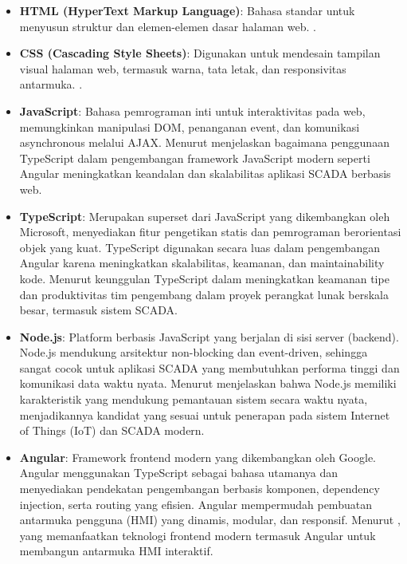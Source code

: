 \begin{itemize}
    \item \textbf{HTML (HyperText Markup Language)}: Bahasa standar untuk menyusun struktur dan elemen-elemen dasar halaman web. \textcite{bhanarkar2023responsive}.

    \item \textbf{CSS (Cascading Style Sheets)}: Digunakan untuk mendesain tampilan visual halaman web, termasuk warna, tata letak, dan responsivitas antarmuka. \textcite{singh2014responsive}.

    \item \textbf{JavaScript}: Bahasa pemrograman inti untuk interaktivitas pada web, memungkinkan manipulasi DOM, penanganan event, dan komunikasi asynchronous melalui AJAX. Menurut \textcite{emmanni2025typescript} menjelaskan bagaimana penggunaan TypeScript dalam pengembangan framework JavaScript modern seperti Angular meningkatkan keandalan dan skalabilitas aplikasi SCADA berbasis web.

    \item \textbf{TypeScript}: Merupakan superset dari JavaScript yang dikembangkan oleh Microsoft, menyediakan fitur pengetikan statis dan pemrograman berorientasi objek yang kuat. TypeScript digunakan secara luas dalam pengembangan Angular karena meningkatkan skalabilitas, keamanan, dan maintainability kode. Menurut \textcite{scarsbrook2023typescript} keunggulan TypeScript dalam meningkatkan keamanan tipe dan produktivitas tim pengembang dalam proyek perangkat lunak berskala besar, termasuk sistem SCADA.

    \item \textbf{Node.js}: Platform berbasis JavaScript yang berjalan di sisi server (backend). Node.js mendukung arsitektur non-blocking dan event-driven, sehingga sangat cocok untuk aplikasi SCADA yang membutuhkan performa tinggi dan komunikasi data waktu nyata. Menurut \textcite{ancona2018nodejs} menjelaskan bahwa Node.js memiliki karakteristik yang mendukung pemantauan sistem secara waktu nyata, menjadikannya kandidat yang sesuai untuk penerapan pada sistem Internet of Things (IoT) dan SCADA modern.

    \item \textbf{Angular}: Framework frontend modern yang dikembangkan oleh Google. Angular menggunakan TypeScript sebagai bahasa utamanya dan menyediakan pendekatan pengembangan berbasis komponen, dependency injection, serta routing yang efisien. Angular mempermudah pembuatan antarmuka pengguna (HMI) yang dinamis, modular, dan responsif. Menurut \textcite{jointjs2023scada}, yang memanfaatkan teknologi frontend modern termasuk Angular untuk membangun antarmuka HMI interaktif.

\end{itemize}

